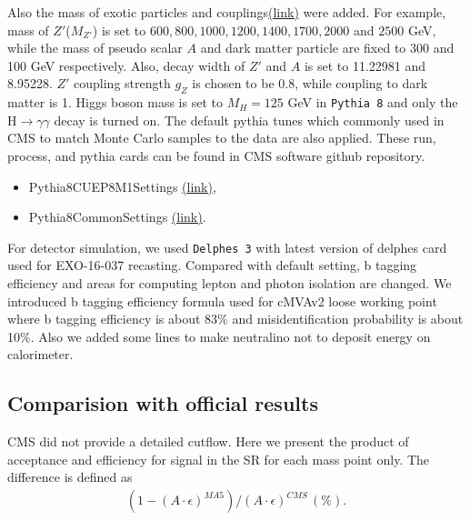 \documentclass[12pt,A4paper]{article}
\begin{document}
Also the mass of exotic particles and couplings\href{https://github.com/cms-sw/genproductions/blob/mg240/bin/MadGraph5_aMCatNLO/cards/production/13TeV/monoHiggs/Zp2HDM/Zprime_A0h_A0chichi/Zprime_A0h_A0chichi_MZp600_MA0300/Zprime_A0h_A0chichi_MZp600_MA0300_customizecards.dat}{(link)} were added. For example, mass of $Z'$($M_{Z'}$) is set to $600, 800, 1000, 1200, 1400, 1700, 2000$ and $2500$ GeV, while the mass of pseudo scalar $A$ and dark matter particle are fixed to 300 and 100 GeV respectively. Also, decay width of $Z'$ and $A$ is set to 11.22981 and 8.95228. $Z'$ coupling strength $g_Z$ is chosen to be 0.8, while coupling to dark matter is 1\cite{ref:dm}. 
Higgs boson mass is set to $M_H = 125$ GeV in \texttt{Pythia 8} and only the H$\rightarrow\gamma\gamma$ decay is turned on.
The default pythia tunes which commonly used in CMS to match Monte Carlo samples to the data are also applied. These run, process, and pythia cards can be found in CMS software github repository\cite{ref:gitgen}.
\begin{itemize}
    \item Pythia8CUEP8M1Settings \href{https://github.com/cms-sw/cmssw/blob/CMSSW_7_1_9_patch/Configuration/Generator/python/Pythia8CUEP8M1Settings_cfi.py}{(link)},
    \item Pythia8CommonSettings \href{https://github.com/cms-sw/cmssw/blob/CMSSW_7_2_X/Configuration/Generator/python/Pythia8CommonSettings_cfi.py}{(link)}.
\end{itemize}


For detector simulation, we used \texttt{Delphes 3}\cite{ref:delphes} with latest version of delphes card used for EXO-16-037 recasting\cite{ref:exo037}. Compared with default setting, b tagging efficiency and areas for computing lepton and photon isolation are changed\cite{ref:beff,ref:photonid}. We introduced b tagging efficiency formula used for cMVAv2 loose working point where b tagging efficiency is about 83\% and misidentification probability is about 10\%. Also we added some lines to make neutralino not to deposit energy on calorimeter. 

\subsection{Comparision with official results}
 CMS did not provide a detailed cutflow. Here we present the product of acceptance and efficiency for signal in the SR for each mass point only. The difference is defined as 
\begin{align*}
	(1-(A\cdot\epsilon)^{MA5})/(A\cdot\epsilon)^{CMS} \,(\%).
\end{align*}
\end{document}
